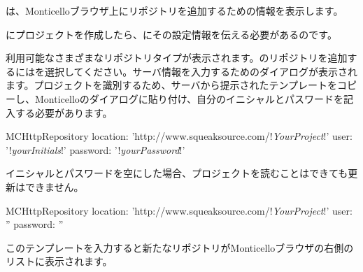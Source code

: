 \documentclass[a4paper,10pt,twoside]{book}
\begin{document}
\sqsrc は、Monticelloブラウザ上にリポジトリを追加するための情報を表示します。

\sqsrc にプロジェクトを作成したら、\pharo にその設定情報を伝える必要があるのです。

利用可能なさまざまなリポジトリタイプが表示されます。\sqsrc のリポジトリを追加するにはを選択してください。サーバ情報を入力するためのダイアログが表示されます。\sqsrc プロジェクトを識別するため、サーバから提示されたテンプレートをコピーし、Monticelloのダイアログに貼り付け、自分のイニシャルとパスワードを記入する必要があります。

\begin{code}{}
MCHttpRepository
    location: 'http://www.squeaksource.com/!\emph{YourProject}!'
    user: '!\emph{yourInitials}!'
    password: '!\emph{yourPassword}!'
\end{code}

\noindent
イニシャルとパスワードを空にした場合、プロジェクトを読むことはできても更新はできません。

\begin{code}{}
MCHttpRepository
    location: 'http://www.squeaksource.com/!\emph{YourProject}!'
    user: ''
    password: ''
\end{code}

このテンプレートを入力すると新たなリポジトリがMonticelloブラウザの右側のリストに表示されます。
\end{document}
